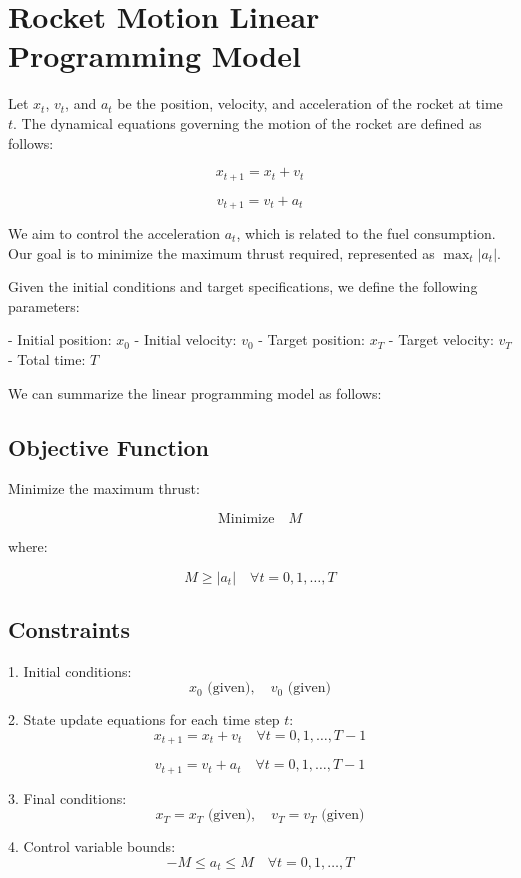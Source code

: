 \documentclass{article}
\begin{document}
\section*{Rocket Motion Linear Programming Model}

Let \( x_t \), \( v_t \), and \( a_t \) be the position, velocity, and acceleration of the rocket at time \( t \). The dynamical equations governing the motion of the rocket are defined as follows:

\[
x_{t+1} = x_t + v_t
\]

\[
v_{t+1} = v_t + a_t
\]

We aim to control the acceleration \( a_t \), which is related to the fuel consumption. Our goal is to minimize the maximum thrust required, represented as \( \max_t |a_t| \).

Given the initial conditions and target specifications, we define the following parameters:

- Initial position: \( x_0 \)
- Initial velocity: \( v_0 \)
- Target position: \( x_T \)
- Target velocity: \( v_T \)
- Total time: \( T \)

We can summarize the linear programming model as follows:

\subsection*{Objective Function}

Minimize the maximum thrust:

\[
\text{Minimize} \quad M
\]

where:

\[
M \geq |a_t| \quad \forall t = 0, 1, \ldots, T
\]

\subsection*{Constraints}

1. Initial conditions:
    \[
    x_0 \text{ (given)}, \quad v_0 \text{ (given)}
    \]

2. State update equations for each time step \( t \):
    \[
    x_{t+1} = x_t + v_t \quad \forall t = 0, 1, \ldots, T-1
    \]

    \[
    v_{t+1} = v_t + a_t \quad \forall t = 0, 1, \ldots, T-1
    \]

3. Final conditions:
    \[
    x_T = x_T \text{ (given)}, \quad v_T = v_T \text{ (given)}
    \]

4. Control variable bounds:
    \[
    -M \leq a_t \leq M \quad \forall t = 0, 1, \ldots, T
    \]
\end{document}
